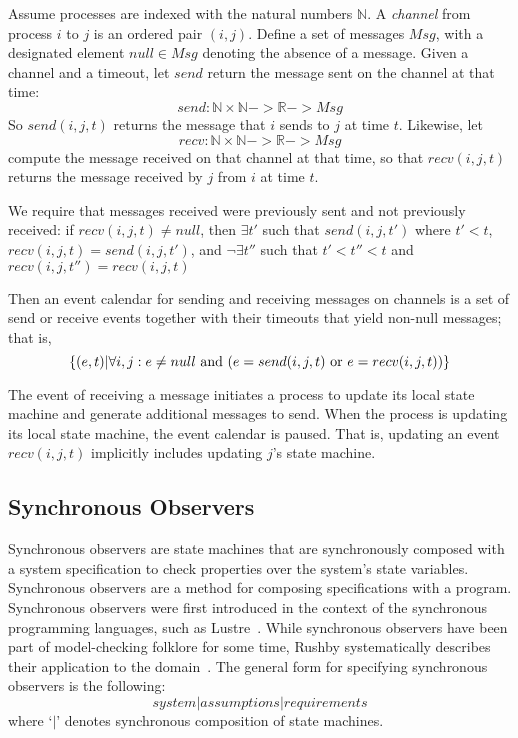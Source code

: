 \documentclass{IEEEtran/IEEEtran}
\newcommand{\lee}[1]{ } %
\newcommand{\lee}[1]{ {\color{blue}$<$lee: #1$>$} } %
\begin{document}
Assume processes are indexed with the natural numbers $\mathbb{N}$. A \emph{channel} from process $i$ to $j$ is an ordered pair $(i,j)$. Define a set of messages $Msg$, with a designated element $null \in Msg$ denoting the absence of a message. Given a channel and a timeout, let $send$ return the message sent on the channel at that time:
$$send : \mathbb{N} \times \mathbb{N} -> \mathbb{R} -> Msg$$
So $send(i, j, t)$ returns the message that $i$ sends to $j$ at time $t$. Likewise, let
$$recv : \mathbb{N} \times \mathbb{N} -> \mathbb{R} -> Msg$$
compute the message received on that channel at that time, so that $recv(i, j, t)$ returns the message received by $j$ from $i$ at time $t$.

We require that messages received were previously sent and not previously received: if $recv(i, j, t) \neq null$, then $\exists t'$ such that $send(i, j, t')$ where $t' < t$, $recv(i, j, t) = send(i, j, t')$, and $\neg\exists t''$ such that $t' < t'' < t$ and $recv(i, j, t'') = recv(i, j, t)$

Then an event calendar for sending and receiving messages on channels is a set of send or receive events together with their timeouts that yield non-null messages; that is,
$$
\{ (e, t) | \forall i,j: e \neq null \textnormal{ and } (e = send(i, j, t) \textnormal{ or } e = recv(i, j, t))
\}
$$

\lee{technically, atomic time is just a convenience.}
The event of receiving a message initiates a process to update its local state machine and generate additional messages to send. When the process is updating its local state machine, the event calendar is paused. That is, updating an event $recv(i, j, t)$ implicitly includes updating $j$'s state machine.

\lee{note that we don't need full generality of send and receive events in OM(1)}

\subsection{Synchronous Observers}\label{sec:sync}
Synchronous observers are state machines that are synchronously composed with a system specification to check properties over the system's state variables. Synchronous observers are a method for composing specifications with a program. Synchronous observers were first introduced in the context of the synchronous programming languages, such as Lustre~\cite{}. While synchronous observers have been part of model-checking folklore for some time, Rushby systematically describes their application to the domain~\cite{}. The general form for specifying synchronous observers is the following:
$$system | assumptions | requirements$$
\noindent
where `$|$' denotes synchronous composition of state machines.
\end{document}
